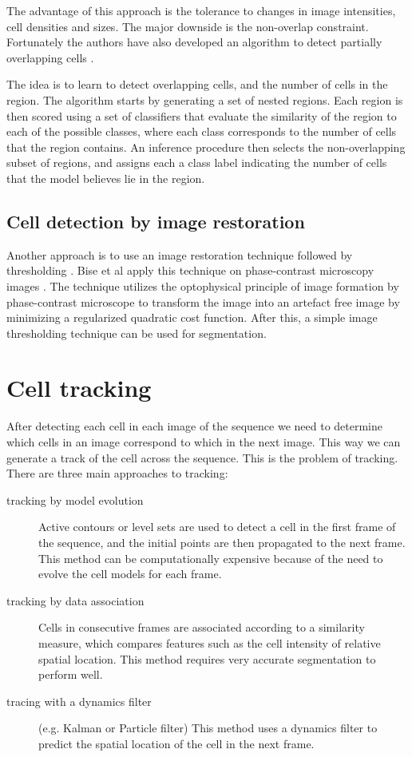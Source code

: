 \documentclass[12pt,a4paper,openany]{book}
\begin{document}
The advantage of this approach is the tolerance to changes in image intensities, cell densities and sizes. The major downside is the non-overlap constraint. Fortunately the authors have also developed an algorithm to detect partially overlapping cells \cite{arteta13}. 

The idea is to learn to detect overlapping cells, and the number of cells in the region. The algorithm starts by generating a set of nested regions. Each region is then scored using a set of classifiers that evaluate the similarity of the region to each of the possible classes, where each class corresponds to the number of cells that the region contains. An inference procedure then selects the non-overlapping subset of regions, and assigns each a class label indicating the number of cells that the model believes lie in the region. 

\subsection{Cell detection by image restoration}

Another approach is to use an image restoration technique followed by thresholding \cite{bise11} \cite{huh13}. Bise et al \cite{bise11} apply this technique on phase-contrast microscopy images . The technique utilizes the optophysical principle of image formation by phase-contrast microscope to transform the image into an artefact free image by minimizing a regularized quadratic cost function. After this, a simple image thresholding technique can be used for segmentation.

\section{Cell tracking}
\label{sec:tracking}

After detecting each cell in each image of the sequence we need to determine which cells in an image correspond to which in the next image. This way we can generate a track of the cell across the sequence. This is the problem of tracking. There are three main approaches to tracking:

\begin{description}
	\item [tracking by model evolution] Active contours or level sets are used to detect a cell in the first frame of the sequence, and the initial points are then propagated to the next frame. This method can be computationally expensive because of the need to evolve the cell models for each frame.
	\item [tracking by data association] Cells in consecutive frames are associated according to a similarity measure, which compares features such as the cell intensity of relative spatial location. This method requires very accurate segmentation to perform well.
	\item [tracing with a dynamics filter] (e.g. Kalman or Particle filter) This method uses a dynamics filter to predict the spatial location of the cell in the next frame.
\end{description}
\end{document}
